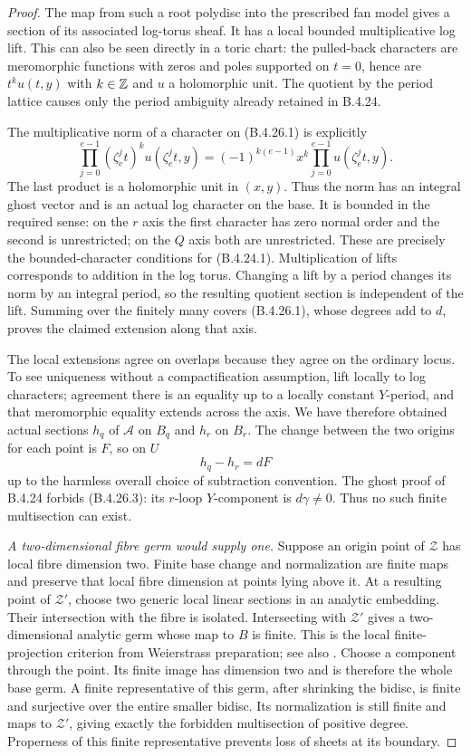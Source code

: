 \begin{proof}
The map from such a root polydisc into the
prescribed fan model gives a section of its
associated log-torus sheaf. It has a local bounded
multiplicative log lift. This can also be seen
directly in a toric chart: the pulled-back characters
are meromorphic functions with zeros and poles
supported on $t=0$, hence are $t^k u(t,y)$ with
$k\in\mathbb Z$ and $u$ a holomorphic unit. The quotient
by the period lattice causes only the period
ambiguity already retained in B.4.24.

The multiplicative norm of a character on (B.4.26.1)
is explicitly
\[
 \prod_{j=0}^{e-1}(\zeta_e^j t)^k
              u(\zeta_e^j t,y)
 =(-1)^{k(e-1)}x^k
              \prod_{j=0}^{e-1}u(\zeta_e^j t,y).
 \tag{B.4.26.2}
\]
The last product is a holomorphic unit in $(x,y)$.
Thus the norm has an integral ghost vector and
is an actual log character on the base. It is
bounded in the required sense: on the $r$ axis
the first character has zero normal order and
the second is unrestricted; on the $Q$ axis
both are unrestricted. These are precisely the
bounded-character conditions for (B.4.24.1).
Multiplication of lifts corresponds to addition
in the log torus. Changing a lift by a period
changes its norm by an integral period, so the
resulting quotient section is independent of
the lift. Summing over the finitely many covers
(B.4.26.1), whose degrees add to $d$, proves the
claimed extension along that axis.

The local extensions agree on overlaps because
they agree on the ordinary locus. To see uniqueness
without a compactification assumption, lift locally
to log characters; agreement there is an equality
up to a locally constant $Y$-period, and that
meromorphic equality extends across the axis.
We have therefore obtained actual sections
$h_q$ of $\mathcal A$ on $B_q$ and $h_r$ on
$B_r$. The change between the two origins for
each point is $F$, so on $U$
\[
 h_q-h_r=dF
 \tag{B.4.26.3}
\]
up to the harmless overall choice of subtraction
convention. The ghost proof of B.4.24 forbids
(B.4.26.3): its $r$-loop $Y$-component is
$d\gamma\ne0$. Thus no such finite multisection
can exist.

\emph{A two-dimensional fibre germ would supply one.}
Suppose an origin point of $\mathcal Z$ has local
fibre dimension two. Finite base change and
normalization are finite maps and preserve that
local fibre dimension at points lying above it.
At a resulting point of $\mathcal Z'$, choose
two generic local linear sections in an analytic
embedding. Their intersection with the fibre is
isolated. Intersecting with $\mathcal Z'$ gives
a two-dimensional analytic germ whose map to
$B$ is finite. This is the local finite-projection
criterion from Weierstrass preparation; see also
\citet[Chapter II, Sections 7--8]{Demailly2012E}.
Choose a component through the point. Its finite
image has dimension two and is therefore the
whole base germ. A finite representative of this
germ, after shrinking the bidisc, is finite and
surjective over the entire smaller bidisc. Its
normalization is still finite and maps to
$\mathcal Z'$, giving exactly the forbidden
multisection of positive degree. Properness of
this finite representative prevents loss of
sheets at its boundary.


\end{proof}
